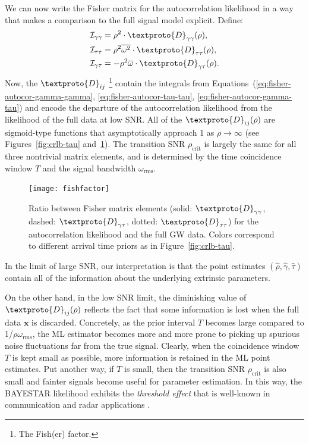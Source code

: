 \documentclass[amsmath,amssymb,aps,prx,reprint,nopreprintnumbers,nofootinbib]{revtex4-1}
\begin{document}
We can now write the Fisher matrix for the autocorrelation likelihood in a way that makes a comparison to the full signal model explicit. Define:
%
\begin{align*}
    \mathcal{I}_{\gamma\gamma} &= \rho^2 \cdot \textproto{D}_{\gamma\gamma}(\rho), \\
    \mathcal{I}_{\tau\tau} &= \rho^2 \overline{\omega^2} \cdot \textproto{D}_{\tau\tau}(\rho), \\
    \mathcal{I}_{\gamma\tau} &= -\rho^2 \overline{\omega} \cdot \textproto{D}_{\gamma\tau}(\rho).
\end{align*}
%
Now, the $\textproto{D}_{ij}$%
%
\footnote{The Fish(er) factor.}
%
contain the integrals from Equations~(\ref{eq:fisher-autocor-gamma-gamma}, \ref{eq:fisher-autocor-tau-tau}, \ref{eq:fisher-autocor-gamma-tau}) and encode the departure of the autocorrelation likelihood from the likelihood of the full data at low \ac{SNR}. All of the $\textproto{D}_{ij}(\rho)$ are sigmoid-type functions that asymptotically approach 1 as $\rho \rightarrow \infty$ (see Figures~\ref{fig:crlb-tau} and~\ref{fig:fishfactor}). The transition \ac{SNR} $\rho_\mathrm{crit}$ is largely the same for all three nontrivial matrix elements, and is determined by the time coincidence window $T$ and the signal bandwidth $\omega_\mathrm{rms}$.

\begin{figure}
    \centering
    \texttt{[image: fishfactor]}
    \caption[Ratio of Fisher matrix elements between autocorrelation likelihood and full \acs{GW} data]{\label{fig:fishfactor}Ratio between Fisher matrix elements (solid: $\textproto{D}_{\gamma\gamma}$, dashed: $\textproto{D}_{\gamma\tau}$, dotted: $\textproto{D}_{\tau\tau}$) for the autocorrelation likelihood and the full \ac{GW} data. Colors correspond to different arrival time priors as in Figure~\ref{fig:crlb-tau}.}
\end{figure}

In the limit of large \ac{SNR}, our interpretation is that the point estimates $(\hat\rho, \hat\gamma, \hat\tau)$ contain all of the information about the underlying extrinsic parameters.

On the other hand, in the low \ac{SNR} limit, the diminishing value of $\textproto{D}_{ij}(\rho)$ reflects the fact that some information is lost when the full data $\mathbf{x}$ is discarded. Concretely, as the prior interval $T$ becomes large compared to 1/$\rho\omega_\mathrm{rms}$, the \ac{ML} estimator becomes more and more prone to picking up spurious noise fluctuations far from the true signal. Clearly, when the coincidence window $T$ is kept small as possible, more information is retained in the \ac{ML} point estimates. Put another way, if $T$ is small, then the transition \ac{SNR} $\rho_\mathrm{crit}$ is also small and fainter signals become useful for parameter estimation. In this way, the \ac{BAYESTAR} likelihood exhibits the \emph{threshold effect} that is well\nobreakdashes-known in communication and radar applications \citep{barankin1949locally,mcaulay1969barankin,mcaulay1971barankin}.
\end{document}
